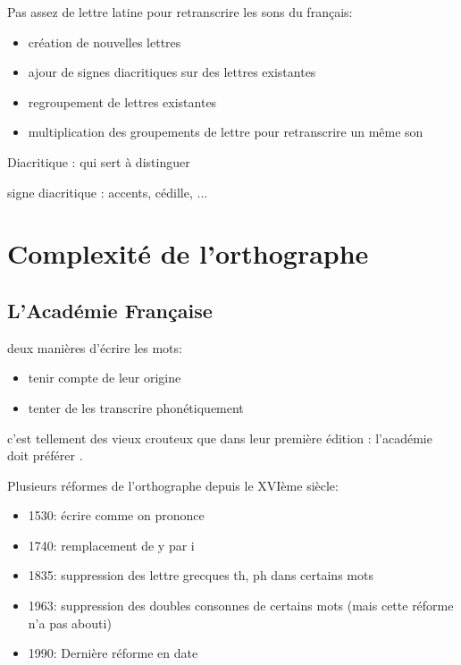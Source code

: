 Pas assez de lettre latine pour retranscrire les sons du français:
\begin{itemize}
   \item création de nouvelles lettres
   \item ajour de signes diacritiques sur des lettres existantes
   \item regroupement de lettres existantes
   \item multiplication des groupements de lettre pour retranscrire un même son
\end{itemize}

\begin{def}
   Diacritique : qui sert à distinguer
\end{def}
signe diacritique : accents, cédille, ...
\section{Complexité de l'orthographe}
\subsection{L'Académie Française}
deux manières d'écrire les mots:
\begin{itemize}
   \item tenir compte de leur origine
   \item tenter de les transcrire phonétiquement
\end{itemize}

c'est tellement des vieux crouteux que dans leur première édition : l'académie doit préférer .

Plusieurs réformes de l'orthographe depuis le XVIème siècle:
\begin{itemize}
   \item 1530: écrire comme on prononce
   \item 1740: remplacement de y par i
   \item 1835: suppression des lettre grecques th, ph dans certains mots
   \item 1963: suppression des doubles consonnes de certains mots (mais cette réforme n'a pas abouti)
   \item 1990: Dernière réforme en date
\end{itemize}
